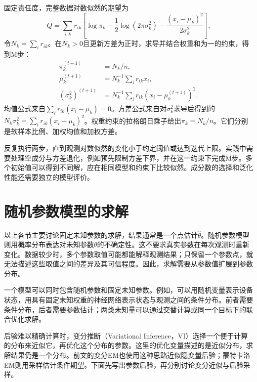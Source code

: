 固定责任度，完整数据对数似然的期望为
\begin{equation}
 Q=\sum_{i,k}r_{ik}\left[\log\pi_k-\frac12\log(2\pi\sigma_k^2)
 -\frac{(x_i-\mu_k)^2}{2\sigma_k^2}\right].
\end{equation}
令$N_k=\sum_i r_{ik}$。在$N_k>0$且更新方差为正时，求导并结合权重和为一的约束，得到M步：
\begin{align}
 \pi_k^{(t+1)}&=N_k/n,\\
 \mu_k^{(t+1)}&=N_k^{-1}\sum_i r_{ik}x_i,\\
 (\sigma_k^2)^{(t+1)}&=N_k^{-1}\sum_i r_{ik}(x_i-\mu_k^{(t+1)})^2.
\end{align}
均值公式来自$\sum_i r_{ik}(x_i-\mu_k)=0$。方差公式来自对$\sigma_k^2$求导后得到的$N_k\sigma_k^2=\sum_i r_{ik}(x_i-\mu_k)^2$。权重约束的拉格朗日乘子给出$\pi_k=N_k/n$。它们分别是软样本比例、加权均值和加权方差。

反复执行两步，直到观测对数似然的变化小于约定阈值或达到迭代上限。实践中需要处理空成分与方差退化，例如预先限制方差下界，并在这一约束下完成M步。多个初始值可以得到不同解，应在相同模型和约束下比较似然。成分数的选择和泛化性能还需要独立的模型评价。

\section{随机参数模型的求解}

以上各节主要讨论固定未知参数的求解，结果通常是一个点估计$\hat\theta$。随机参数模型则用概率分布表达对未知参数$\theta$的不确定性。这不要求真实参数在每次观测时重新变化。数据较少时，多个参数取值可能都能解释观测结果；只保留一个参数点，就无法描述这些取值之间的差异及其可信程度。因此，求解需要从参数值扩展到参数分布。

一个模型可以同时包含随机参数和固定未知参数。例如，可以用随机变量表示设备状态，用具有固定未知权重的神经网络表示状态与观测之间的条件分布。前者需要条件分布，后者需要参数估计；两类未知量可以通过交替计算或同一个目标下的联合优化求解。

后验难以精确计算时，变分推断（Variational Inference，VI）选择一个便于计算的分布来近似它，再优化这个分布的参数。这里的优化变量描述的是近似分布，求解结果仍是一个分布。前文的变分EM也使用这种思路近似隐变量后验；蒙特卡洛EM则用采样估计条件期望。下面先写出参数后验，再分别讨论变分近似与后验采样。

